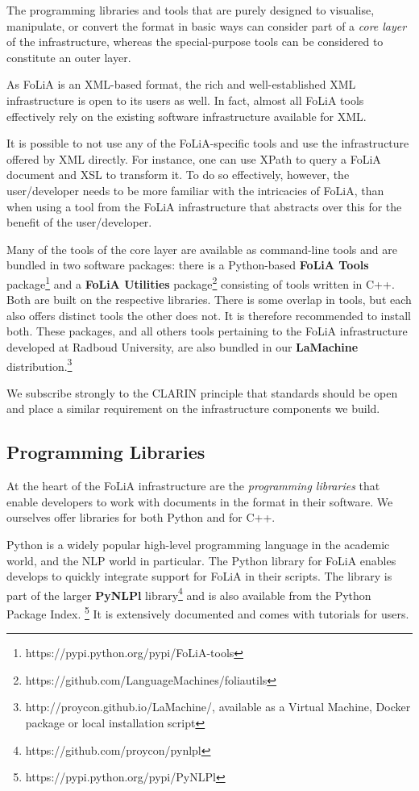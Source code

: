 \documentclass[a4paper,11pt]{article}
\begin{document}
The programming libraries and tools that are purely designed to visualise,
manipulate, or convert the format in basic ways can consider part of a
\emph{core layer} of the infrastructure, whereas the special-purpose tools can
be considered to constitute an outer layer.

As FoLiA is an XML-based format, the rich and well-established XML
infrastructure is open to its users as well. In fact, almost all FoLiA tools
effectively rely on the existing software infrastructure available for XML. 

It is possible to not use any of the FoLiA-specific tools and use the
infrastructure offered by XML directly. For instance, one can use XPath to
query a FoLiA document and XSL to transform it. To do so effectively, however,
the user/developer needs to be more familiar with the intricacies of FoLiA,
than when using a tool from the FoLiA infrastructure that abstracts over this
for the benefit of the user/developer.

Many of the tools of the core layer are available as command-line tools and are
bundled in two software packages: there is a Python-based \textbf{FoLiA Tools}
package\footnote{https://pypi.python.org/pypi/FoLiA-tools} and a \textbf{FoLiA
Utilities} package\footnote{https://github.com/LanguageMachines/foliautils}
consisting of tools written in C++. Both are built on the respective libraries.
There is some overlap in tools, but each also offers distinct tools the other
does not. It is therefore recommended to install both. These packages, and all
others tools pertaining to the FoLiA infrastructure developed at Radboud
University, are also bundled in our \textbf{LaMachine}
distribution.\footnote{http://proycon.github.io/LaMachine/, available as a
Virtual Machine, Docker package or local installation script}

We subscribe strongly to the CLARIN principle that standards should be open and
place a similar requirement on the infrastructure components we build. 

\subsection{Programming Libraries}

At the heart of the FoLiA infrastructure are the \emph{programming libraries} that
enable developers to work with documents in the format in their software. We
ourselves offer libraries for both Python and for C++.

Python is a widely popular high-level programming language in the academic
world, and the NLP world in particular.  The Python library for FoLiA enables
develops to quickly integrate support for FoLiA in their scripts. The library
is part of the larger \textbf{PyNLPl}
library\footnote{https://github.com/proycon/pynlpl} and is also available from the
Python Package Index. \footnote{https://pypi.python.org/pypi/PyNLPl} It is extensively documented and comes with tutorials for
users.
\end{document}
